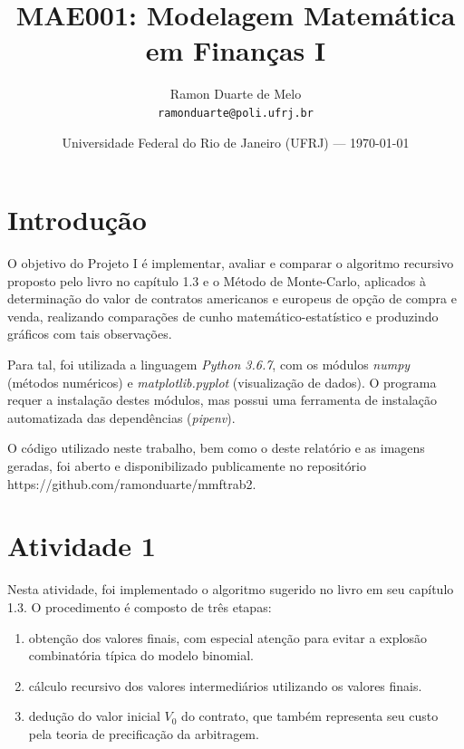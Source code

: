 \documentclass{article}
\title{MAE001: Modelagem Matemática em Finanças I} %
\author{Ramon Duarte de Melo\\ \texttt{ramonduarte@poli.ufrj.br}} %
\date{Universidade Federal do Rio de Janeiro (UFRJ) --- \today} %
\begin{document}
\maketitle %


\section*{Introdução} %

O objetivo do Projeto I é implementar, avaliar e comparar o algoritmo recursivo proposto pelo livro no capítulo 1.3 e o Método de Monte-Carlo, aplicados à determinação do valor de contratos americanos e europeus de opção de compra e venda, realizando comparações de cunho matemático-estatístico e produzindo gráficos com tais observações. 

Para tal, foi utilizada a linguagem \emph{Python 3.6.7}, com os módulos \emph{numpy} (métodos numéricos) e \emph{matplotlib.pyplot} (visualização de dados).
O programa requer a instalação destes módulos, mas possui uma ferramenta de instalação automatizada das dependências (\emph{pipenv}). 

O código utilizado neste trabalho, bem como o deste relatório e as imagens geradas, foi aberto e disponibilizado publicamente no repositório https://github.com/ramonduarte/mmftrab2.



\section*{Atividade 1} %

Nesta atividade, foi implementado o algoritmo sugerido no livro em seu capítulo 1.3.
O procedimento é composto de três etapas:

\begin{enumerate}
	\item obtenção dos valores finais, com especial atenção para evitar a explosão combinatória típica do modelo binomial.
	\item cálculo recursivo dos valores intermediários utilizando os valores finais.
	\item dedução do valor inicial $V_{0}$ do contrato, que também representa seu custo pela teoria de precificação da arbitragem.
\end{enumerate}
\end{document}
